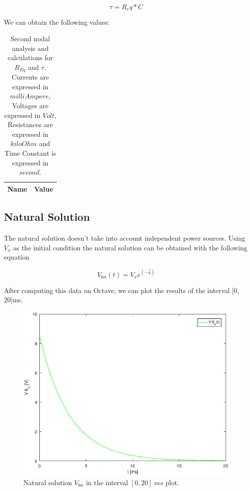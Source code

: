 \begin{equation}
	\tau = R_eq * C
\end{equation}

We can obtain the following values:

\begin{table}[h]
  \centering
  \begin{tabular}{|l|r|}
    \hline    
    {\bf Name} & {\bf Value} \\ \hline
     
  \end{tabular}
  \caption{Second nodal analysis and calculations for $R_{Eq}$ and $\tau$. Currents are expressed in $milliAmpere$, Voltages are expressed in $Volt$, Resistances are expressed in $kiloOhm$ and Time Constant is expressed in $second$.}
  \label{tab:theoretical2}
\end{table}

\subsection{Natural Solution}


\paragraph{} The natural solution doesn't take into account independent power sources. Using $V_x$ as the initial condition the natural solution can be obtained with the following equation

\begin{equation}
	V_{6n}(t) = V_x e^{(-\frac{t}{\tau})}
\end{equation}

After computing this data on Octave, we can plot the results of the interval [0, 20]ms.


\begin{figure}[h] \centering
\includegraphics[width=0.6\linewidth]{natural.eps}
	\caption{Natural solution $V_{6n}$ in the interval $[0, 20]~ms$ plot.}
\label{fig:natural}
\end{figure}


